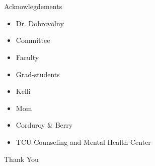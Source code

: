 \documentclass{beamer}
\makeatletter
\def\beamer@writeslidentry@miniframesoff{%
  \expandafter\beamer@ifempty\expandafter{\beamer@framestartpage}{}%
  {%
    \clearpage\beamer@notesactions%
  }
}
\newcommand*{\miniframesoff}{\let\beamer@writeslidentry=\beamer@writeslidentry@miniframesoff}
\makeatother
\begin{document}
\miniframesoff
    \section{}

\begin{frame}{Acknowlegdements}

    \begin{itemize}
        \item<2-> Dr. Dobrovolny
        \item<3-> Committee
        \item<4-> Faculty
        \item<5-> Grad-students
        \item<6-> Kelli
        \item<7-> Mom
        \item<8-> Corduroy \& Berry
        \item<9-> TCU Counseling and Mental Health Center 
    \end{itemize}

\end{frame}

\begin{frame}{}

\begin{center}
\Huge Thank You
\end{center}

\end{frame}


\miniframesoff
    \section{}

\begin{frame}{}
\end{frame}
\end{document}
